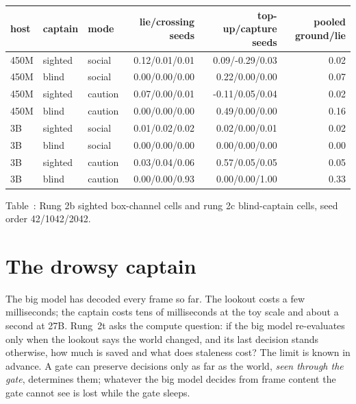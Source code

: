 \documentclass[11pt]{article}
\begin{document}
\begin{center}
{\scriptsize
\setlength{\tabcolsep}{3pt}%
\begin{tabular}{lllrrr}
\toprule
host & captain & mode & lie/crossing seeds & top-up/capture seeds & pooled ground/lie \\
\midrule
450M & sighted & social & 0.12/0.01/0.01 & 0.09/-0.29/0.03 & 0.02 \\
450M & blind & social & 0.00/0.00/0.00 & 0.22/0.00/0.00 & 0.07 \\
450M & sighted & caution & 0.07/0.00/0.01 & -0.11/0.05/0.04 & 0.02 \\
450M & blind & caution & 0.00/0.00/0.00 & 0.49/0.00/0.00 & 0.16 \\
3B & sighted & social & 0.01/0.02/0.02 & 0.02/0.00/0.01 & 0.02 \\
3B & blind & social & 0.00/0.00/0.00 & 0.00/0.00/0.00 & 0.00 \\
3B & sighted & caution & 0.03/0.04/0.06 & 0.57/0.05/0.05 & 0.05 \\
3B & blind & caution & 0.00/0.00/0.93 & 0.00/0.00/1.00 & 0.33 \\
\bottomrule
\end{tabular}
}
\end{center}
\noindent Table~\thetable: Rung 2b sighted box-channel cells and rung 2c blind-captain cells, seed order 42/1042/2042.
\label{tab:safety}
\par

\clearpage

\section{The drowsy captain}\label{sec:economics}

The big model has decoded every frame so far. The lookout costs a few
milliseconds; the captain costs tens of milliseconds at the toy scale
and about a second at 27B. Rung~2t asks the compute question: if the
big model re-evaluates only when the lookout says the world changed,
and its last decision stands otherwise, how much is saved and what does
staleness cost? The limit is known in advance. A gate can preserve
decisions only as far as the world, \emph{seen through the gate},
determines them; whatever the big model decides from frame content the
gate cannot see is lost while the gate sleeps.
\end{document}
